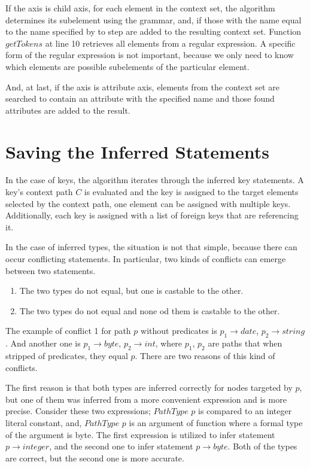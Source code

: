 If the axis is child axis, for each element in the context set, the algorithm determines its subelement using the grammar, and, if those with the name equal to the name specified by to step are added to the resulting context set. Function $getTokens$ at line 10 retrieves all elements from a regular expression. A specific form of the regular expression is not important, because we only need to know which elements are possible subelements of the particular element.

And, at last, if the axis is attribute axis, elements from the context set are searched to contain an attribute with the specified name and those found attributes are added to the result.

\section{Saving the Inferred Statements}
In the case of keys, the algorithm iterates through the inferred key statements. A key's context path $C$ is evaluated and the key is assigned to the target elements selected by the context path, one element can be assigned with multiple keys. Additionally, each key is assigned with a list of foreign keys that are referencing it.

In the case of inferred types, the situation is not that simple, because there can occur conflicting statements. In particular, two kinds of conflicts can emerge between two statements.

\begin{enumerate}
\item The two types do not equal, but one is castable to the other.
\item The two types do not equal and none od them is castable to the other.
\end{enumerate}

The example of conflict 1 for path $p$ without predicates is $p_1 \rightarrow date$, $p_2 \rightarrow string$. And another one is $p_1 \rightarrow byte$, $p_2 \rightarrow int$, where $p_1$, $p_2$ are paths that when stripped of predicates, they equal $p$. There are two reasons of this kind of conflicts.

The first reason is that both types are inferred correctly for nodes targeted by $p$, but one of them was inferred from a more convenient expression and is more precise. Consider these two expressions; $PathType$ $p$ is compared to an integer literal constant, and, $PathType$ $p$ is an argument of function where a formal type of the argument is byte. The first expression is utilized to infer statement $p \rightarrow integer$, and the second one to infer statement $p \rightarrow byte$. Both of the types are correct, but the second one is more accurate.